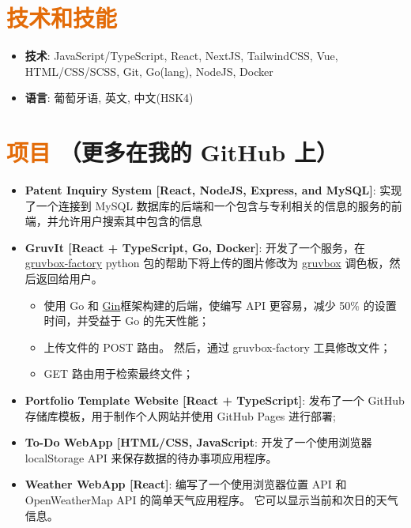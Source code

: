 \documentclass[a4paper, 20pt]{article}
\newcommand{\resumeItem}[2]{
  \item\small{
    \textbf{#1}{: #2 \vspace{-2pt}}
  }
}
\newcommand{\resumeSubItem}[2]{\resumeItem{#1}{#2}\vspace{-3pt}}
\newcommand{\resumeSubHeadingListStart}{\begin{itemize}[leftmargin=*]}
\newcommand{\resumeSubHeadingListEnd}{\end{itemize}}
\begin{document}
\begin{CJK*}{UTF8}{gbsn}
\vspace{5pt}
\section{\textcolor[HTML]{E36C09}{\textbf{技术和技能}}}
	\resumeSubHeadingListStart
	  \resumeSubItem{技术}{\quad JavaScript/TypeScript, React, NextJS, TailwindCSS, Vue, HTML/CSS/SCSS, Git, Go(lang), NodeJS, Docker}
	  \resumeSubItem{语言}{\quad 葡萄牙语, 英文, 中文(HSK4)}
  \resumeSubHeadingListEnd


\vspace{5pt}
\section{\textcolor[HTML]{E36C09}{\textbf{项目}} \tiny{（更多在我的 GitHub 上）}}
  \resumeSubHeadingListStart
    \resumeSubItem{Patent Inquiry System [React, NodeJS, Express, and MySQL]}
      {实现了一个连接到 MySQL 数据库的后端和一个包含与专利相关的信息的服务的前端，并允许用户搜索其中包含的信息}
      \vspace{2pt}
      \resumeSubItem{GruvIt [React + TypeScript, Go, Docker]}
      {开发了一个服务，在 \href{https://github.com/paulopacitti/gruvbox-factory}{gruvbox-factory} python 包的帮助下将上传的图片修改为 \href{https://github.com/morhetz/gruvbox}{gruvbox} 调色板，然后返回给用户。}
      \begin{itemize}
        \item{使用 Go 和 \href{https://github.com/gin-gonic/gin}{Gin}框架构建的后端，使编写 API 更容易，减少 50\% 的设置时间，并受益于 Go 的先天性能；}
        \item{上传文件的 POST 路由。 然后，通过 gruvbox-factory 工具修改文件；}
        \item{GET 路由用于检索最终文件；}
      \end{itemize}
      \vspace{2pt}
    \resumeSubItem{Portfolio Template Website [React + TypeScript]}
      {发布了一个 GitHub 存储库模板，用于制作个人网站并使用 GitHub Pages 进行部署;}
      \vspace{2pt}
    \resumeSubItem{To-Do WebApp [HTML/CSS, JavaScript}
      {开发了一个使用浏览器 localStorage API 来保存数据的待办事项应用程序。}
      \vspace{2pt}
    \resumeSubItem{Weather WebApp [React]}
      {编写了一个使用浏览器位置 API 和 OpenWeatherMap API 的简单天气应用程序。 它可以显示当前和次日的天气信息。}
      \vspace{2pt}
  \resumeSubHeadingListEnd

\clearpage\end{CJK*}
\end{document}
